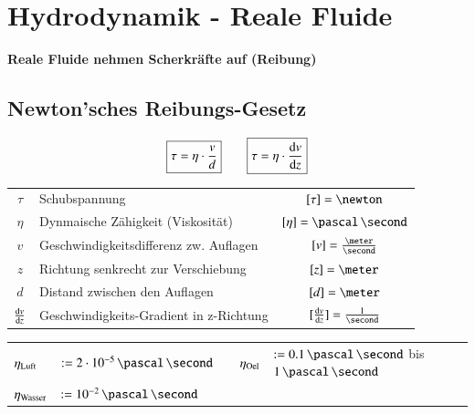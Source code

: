 \section{Hydrodynamik - Reale Fluide}

\textbf{Reale Fluide nehmen Scherkräfte auf (Reibung)}

\subsection{Newton'sches Reibungs-Gesetz}

\vspace{-0.2cm}

\[\boxed{ \tau = \eta \cdot \frac{v}{d} }  \qquad  \boxed{ \tau = \eta \cdot \frac{\mathop{} \! \mathrm{d} v}{\mathop{} \! \mathrm{d} z} } \]

\renewcommand{\arraystretch}{1.3}
\begin{tabular}{c l c}
    $\tau$                      & Schubspannung                             & $[\tau] = \newton$           
                               \\
    $\eta$                      & Dynmaische Zähigkeit (Viskosität)         & $[\eta] = \pascal \, \second$                     \\
    $v$           
                          & Geschwindigkeitsdifferenz zw. Auflagen    & $[v] = \frac{\meter}{\second}$                    \\
    $z$                         & Richtung senkrecht zur Verschiebung       & $[z] = \meter$                              
      \\
    $d$                         & Distand zwischen den Auflagen             & $[d] = \meter$                                    \\
    $\frac{\mathop{} \! \mathrm{d} v}{\mathop{} \! \mathrm{d} z}$   
& Geschwindigkeits-Gradient in z-Richtung   & $[\frac{\diff v}{\diff z}] = \frac{1}{\second}$ 
\end{tabular}
\renewcommand{\arraystretch}{1}

\medskip



\renewcommand{\arraystretch}{1.5}
\begin{tabular}{ll c|c ll}
    $\eta_{\rm Luft}$   & $:= 2 \cdot 10^{-5} \, \pascal \, \second$    & &  $\eta_{\rm Oel}$   & $:= 0.1 \, \pascal \, \second$ \; bis \; $1 \, \pascal \, \second$ \\
    $\eta_{\rm Wasser}$ & $:= 10^{-2} \, \pascal \, \second$            & & \\
\end{tabular}
\renewcommand{\arraystretch}{1}


